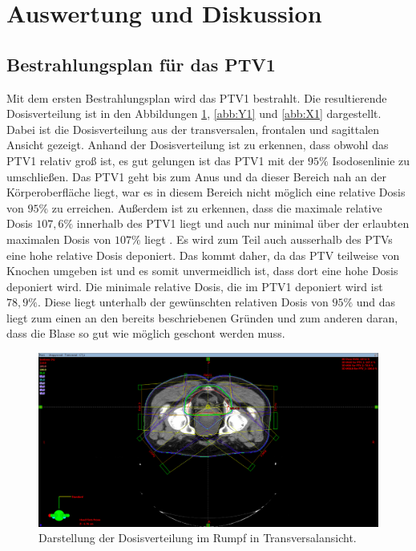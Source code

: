 \section{Auswertung und Diskussion}
\label{sec:AuswertungDiskussion}

\subsection*{Bestrahlungsplan für das PTV1}

Mit dem ersten Bestrahlungsplan wird das PTV1 bestrahlt. Die resultierende Dosisverteilung
ist in den Abbildungen \ref{abb:Z1}, \ref{abb:Y1} und \ref{abb:X1} dargestellt.
Dabei ist die Dosisverteilung aus der transversalen, frontalen und sagittalen Ansicht gezeigt.
Anhand der Dosisverteilung ist zu erkennen, dass obwohl das PTV1 relativ groß ist, es gut gelungen ist das
PTV1 mit der $95\%$ Isodosenlinie zu umschließen. Das PTV1 geht bis zum Anus und da dieser Bereich nah an der Körperoberfläche
liegt, war es in diesem Bereich nicht möglich eine relative Dosis von $95\%$ zu erreichen.
Außerdem ist zu erkennen, dass die maximale relative Dosis $107,6\%$ innerhalb des PTV1 liegt und auch nur minimal
über der erlaubten maximalen Dosis von $107\%$ liegt \cite{ICRU}. Es wird zum Teil auch ausserhalb des PTVs eine hohe relative Dosis deponiert.
Das kommt daher, da das PTV teilweise von Knochen umgeben ist und es somit unvermeidlich ist, dass dort eine hohe Dosis deponiert wird.
Die minimale relative Dosis, die im PTV1 deponiert wird ist $78,9\%$. Diese liegt unterhalb der gewünschten relativen Dosis von $95\%$ und das
liegt zum einen an den bereits beschriebenen Gründen und zum anderen daran, dass die Blase so gut wie möglich geschont werden muss.

\begin{figure}[H]
  \centering
  \includegraphics[width=\textwidth]{Bilder/Rektum1_Z.png}
  \caption{Darstellung der Dosisverteilung im Rumpf in Transversalansicht.}
  \label{abb:Z1}
\end{figure}

